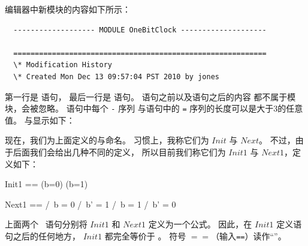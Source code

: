 \begin{ch}
  编辑器中新模块的内容如下所示：
  \begin{display}
  \begin{verbatim}
  ------------------- MODULE OneBitClock --------------------

  ===========================================================
  \* Modification History
  \* Created Mon Dec 13 09:57:04 PST 2010 by jones
  \end{verbatim}
  \end{display}
  第一行是%
  \emph{\tlamoduleopening}语句，
  最后一行是%
  \emph{\tlamoduleclosing}语句。
  \tlamoduleopening{}语句之前以及\tlamoduleclosing{}语句之后的内容
  都不属于模块，会被忽略。
  \tlamoduleopening{}语句中每个 \verb|-| 序列
  与\tlamoduleclosing{}语句中的 \verb|=| 序列的长度可以是大于3的任意值。
  \tlamoduleopening{}与\tlamoduleclosing{}显示如下：
  \begin{display}
  \end{display}
  现在，我们为上面定义的\tlainitpredicate{}与\tlanextstateaction{}命名。
  习惯上，我称它们为 $Init$ 与 $Next$。
  不过，由于后面我们会给出几种不同的定义，
  所以目前我们称它们为 $Init1$ 与 $Next1$，定义如下：
  \begin{display}
    \begin{notla}
    Init1 == (b=0) \/ (b=1)
	 
    Next1 == \/ /\ b = 0
		/\ b' = 1
	     \/ /\ b = 1
		/\ b' = 0
    \end{notla}
    \begin{tlatex}
    \par\vspace{8.0pt}%
    \end{tlatex}
  \end{display}
  上面两个 \tlaplus\ 语句分别将 $Init1$ 和 $Next1$ 定义为一个公式。
  因此，在 $Init1$ 定义语句之后的任何地方，
  $Init1$ 都完全等价于 。
  符号 $\!==\!$（输入\verb|==|）读作``\emph{\tladefeq}''。
\end{ch}

